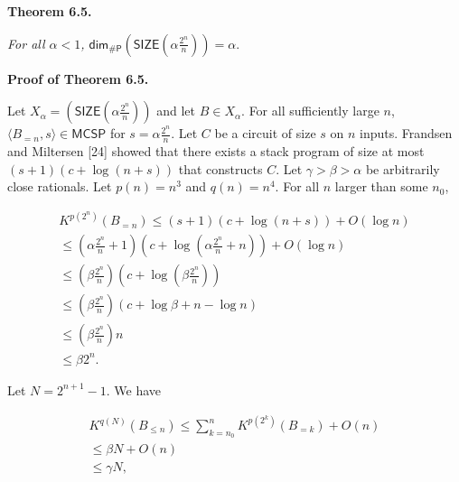 \documentclass[10pt,a4paper]{article}
\begin{document}


\par\medskip\noindent\textbf{
\textbf{Theorem 6.5}\textbf{.}
}\par



\emph{For all $\alpha<1$,
${\mathsf{dim}}_{{\mathsf{\#}\mathsf{P}}}\left(\mathsf{SIZE}\!\left(\alpha\frac{2^{n}}{n}\right)\right)=\alpha.$}\par








\par\medskip\noindent\textbf{Proof of Theorem 6.5.}\par




Let $X_{\alpha}=\left(\mathsf{SIZE}\!\left(\alpha\frac{2^{n}}{n}\right)\right)$ and let $B\in X_{\alpha}$.
For all sufficiently large $n$, $\langle B_{=n},s\rangle\in\mathsf{MCSP}$ for $s=\alpha\frac{2^{n}}{n}$. Let $C$ be a circuit of size $s$ on $n$ inputs. Frandsen and Miltersen [24] showed that there exists a stack program of size at most $(s+1)(c+\log(n+s))$ that constructs $C$. Let $\gamma>\beta>\alpha$ be arbitrarily close rationals. Let $p(n)=n^{3}$ and $q(n)=n^{4}$.
For all $n$ larger than some $n_{0}$,\par


\[\begin{gathered}
\displaystyle K^{p(2^{n})}(B_{=n}) \displaystyle\leq \displaystyle(s+1)(c+\log(n+s))+O(\log n) \\
\displaystyle\leq \displaystyle\left(\alpha\frac{2^{n}}{n}+1\right)\left(c+\log\left(\alpha\frac{2^{n}}{n}+n\right)\right)+O(\log n) \\
\displaystyle\leq \displaystyle\left(\beta\frac{2^{n}}{n}\right)\left(c+\log\left(\beta\frac{2^{n}}{n}\right)\right) \\
\displaystyle\leq \displaystyle\left(\beta\frac{2^{n}}{n}\right)\left(c+\log\beta+n-\log n\right) \\
\displaystyle\leq \displaystyle\left(\beta\frac{2^{n}}{n}\right)n \\
\displaystyle\leq \displaystyle\beta 2^{n}.
\end{gathered}\]


Let $N=2^{n+1}-1$. We have\par


\[\begin{gathered}
\displaystyle K^{q(N)}(B_{\leq n}) \displaystyle\leq \displaystyle\sum_{k=n_{0}}^{n}K^{p(2^{k})}(B_{=k})+O(n) \\
\displaystyle\leq \displaystyle\beta N+O(n) \\
\displaystyle\leq \displaystyle\gamma N,
\end{gathered}\]
\end{document}
